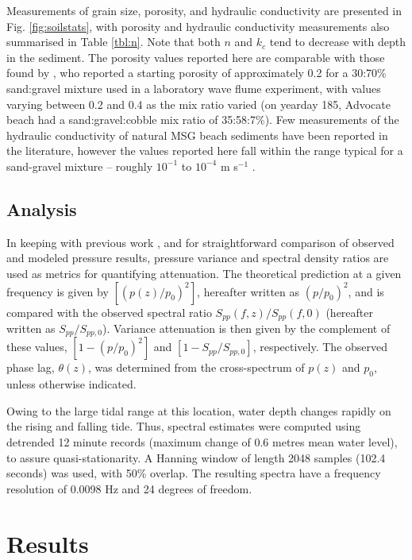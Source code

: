 Measurements of grain size, porosity, and hydraulic conductivity are presented in Fig. \ref{fig:soilstats}, with porosity and hydraulic conductivity measurements also summarised in Table \ref{tbl:n}. Note that both $n$ and $k_{c}$ tend to decrease with depth in the sediment. The porosity values reported here are comparable with those found by \citet{LopezSanRomanBlanco_etal2006}, who reported a starting porosity of approximately 0.2 for a 30:70\% sand:gravel mixture used in a laboratory wave flume experiment, with values varying between 0.2 and 0.4 as the mix ratio varied (on yearday 185, Advocate beach had a sand:gravel:cobble mix ratio of 35:58:7\%). Few measurements of the hydraulic conductivity of natural MSG beach sediments have been reported in the literature, however the values reported here fall within the range typical for a sand-gravel mixture -- roughly $10^{-1}$ to $10^{-4}$ m s$^{-1}$ \citep{Craig1974}.


\subsection{Analysis}

In keeping with previous work \citep [e.g.,][]{Raubenheimer_etal1998, Michallet_etal2009}, and for straightforward comparison of observed and modeled pressure results, pressure variance and spectral density ratios are used as metrics for quantifying attenuation. The theoretical prediction at a given frequency is given by $[(p(z)/p_{0})^{2}]$, hereafter written as $(p/p_{0})^{2}$, and is compared with the observed spectral ratio $S_{pp}(f, z)/S_{pp}(f, 0)$ (hereafter written as $S_{pp}/S_{pp,0}$). Variance attenuation is then given by the complement of these values, $[1 - (p/p_{0})^{2}]$ and $[1 - S_{pp}/S_{pp,0}]$, respectively. The observed phase lag, $\theta(z)$, was determined from the cross-spectrum of $p(z)$ and $p_0$, unless otherwise indicated.

Owing to the large tidal range at this location, water depth changes rapidly on the rising and falling tide. Thus, spectral estimates were computed using detrended 12 minute records (maximum change of 0.6 metres mean water level), to assure quasi-stationarity. A Hanning window of length 2048 samples (102.4 seconds) was used, with 50\% overlap. The resulting spectra have a frequency resolution of 0.0098 Hz and 24 degrees of freedom.


\section{Results}\label{ch1:Results}

